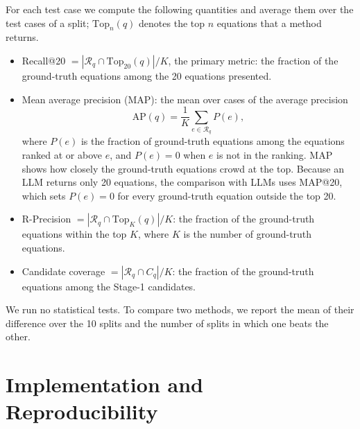 For each test case we compute the following quantities and average them over the test cases of a
split; $\mathrm{Top}_n(q)$ denotes the top $n$ equations that a method returns.
\begin{itemize}
  \item Recall@20 $= |\mathcal{R}_q \cap \mathrm{Top}_{20}(q)| / K$, the primary metric: the
    fraction of the ground-truth equations among the 20 equations presented.
  \item Mean average precision (MAP): the mean over cases of the average precision
    \begin{equation}
      \mathrm{AP}(q) = \frac{1}{K} \sum_{e \in \mathcal{R}_q} P(e) ,
      \label{eq:ap}
    \end{equation}
    where $P(e)$ is the fraction of ground-truth equations among the equations ranked at or above
    $e$, and $P(e) = 0$ when $e$ is not in the ranking. MAP shows how closely the ground-truth
    equations crowd at the top. Because an LLM returns only 20 equations, the comparison with LLMs
    uses MAP@20, which sets $P(e) = 0$ for every ground-truth equation outside the top 20.
  \item R-Precision $= |\mathcal{R}_q \cap \mathrm{Top}_K(q)| / K$: the fraction of the
    ground-truth equations within the top $K$, where $K$ is the number of ground-truth
    equations\cite{Manning}.
  \item Candidate coverage $= |\mathcal{R}_q \cap C_q| / K$: the fraction of the ground-truth
    equations among the Stage-1 candidates.
\end{itemize}

We run no statistical tests. To compare two methods, we report the mean of their difference over
the 10 splits and the number of splits in which one beats the other.

\section{Implementation and Reproducibility}
\label{sec:impl}

